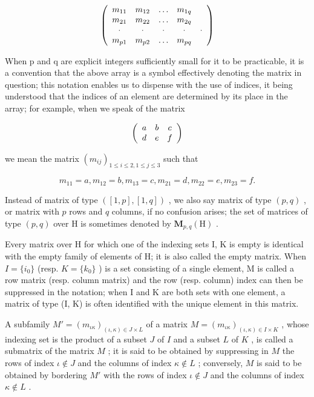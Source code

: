 \[
\left( \begin{array}{c c c c c} m _ {1 1} & m _ {1 2} & \ldots & m _ {1 q} \\ m _ {2 1} & m _ {2 2} & \ldots & m _ {2 q} \\ \cdot & \cdot & \cdot & \cdot & \cdot \\ m _ {p 1} & m _ {p 2} & \ldots & m _ {p q} \end{array} \right)
\]

When p and q are explicit integers sufficiently small for it to be practicable, it is a convention that the above array is a symbol effectively denoting the matrix in question; this notation enables us to dispense with the use of indices, it being understood that the indices of an element are determined by its place in the array; for example, when we speak of the matrix

\[
\left( \begin{array}{c c c} a & b & c \\ d & e & f \end{array} \right)
\]

we mean the matrix \((m_{ij})_{1\leqslant i\leqslant 2,1\leqslant j\leqslant 3}\) such that

\[
m _ {1 1} = a, m _ {1 2} = b, m _ {1 3} = c, m _ {2 1} = d, m _ {2 2} = e, m _ {2 3} = f.
\]

Instead of matrix of type \(([1, p], [1, q])\) , we also say matrix of type \((p, q)\) , or matrix with \(p\) rows and \(q\) columns, if no confusion arises; the set of matrices of type \((p, q)\) over H is sometimes denoted by \(\mathbf{M}_{p,q}(\mathrm{H})\) .

Every matrix over H for which one of the indexing sets I, K is empty is identical with the empty family of elements of H; it is also called the empty matrix. When \(I = \{i_{0}\}\) (resp. \(K = \{k_{0}\}\) ) is a set consisting of a single element, M is called a row matrix (resp. column matrix) and the row (resp. column) index can then be suppressed in the notation; when I and K are both sets with one element, a matrix of type (I, K) is often identified with the unique element in this matrix.

A subfamily \(M' = (m_{\iota \kappa})_{(\iota, \kappa) \in J \times L}\) of a matrix \(M = (m_{\iota \kappa})_{(\iota, \kappa) \in I \times K}\) , whose indexing set is the product of a subset \(J\) of \(I\) and a subset \(L\) of \(K\) , is called a submatrix of the matrix \(M\) ; it is said to be obtained by suppressing in \(M\) the rows of index \(\iota \notin J\) and the columns of index \(\kappa \notin L\) ; conversely, \(M\) is said to be obtained by bordering \(M'\) with the rows of index \(\iota \notin J\) and the columns of index \(\kappa \notin L\) .

